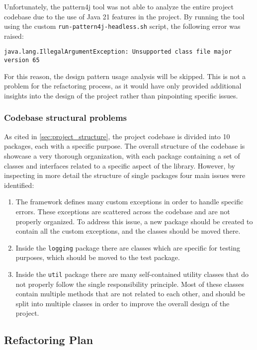 Unfortunately, the pattern4j tool was not able to analyze the entire project codebase due to the use of Java 21 features in the project. By running the tool using the custom \texttt{run-pattern4j-headless.sh} script, the following error was raised:

\begin{verbatim}
java.lang.IllegalArgumentException: Unsupported class file major version 65
\end{verbatim}

\noindent For this reason, the design pattern usage analysis will be skipped. This is not a problem for the refactoring process, as it would have only provided additional insights into the design of the project rather than pinpointing specific issues.

\subsubsection{Codebase structural problems}

As cited in \autoref{sec:project_structure}, the project codebase is divided into 10 packages, each with a specific purpose. The overall structure of the codebase is showcase a very thorough organization, with each package containing a set of classes and interfaces related to a specific aspect of the library. However, by inspecting in more detail the structure of single packages four main issues were identified:

\begin{enumerate}
	\item The framework defines many custom exceptions in order to handle specific errors. These exceptions are scattered across the codebase and are not properly organized. To address this issue, a new package should be created to contain all the custom exceptions, and the classes should be moved there.
	\item Inside the \texttt{logging} package there are classes which are specific for testing purposes, which should be moved to the test package.
	\item Inside the \texttt{util} package there are many self-contained utility classes that do not properly follow the single responsibility principle. Most of these classes contain multiple methods that are not related to each other, and should be split into multiple classes in order to improve the overall design of the project.
\end{enumerate}

\subsection{Refactoring Plan}
\label{sec:refactoring_plan}

